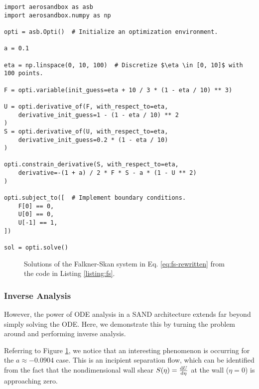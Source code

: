 \begin{listing}[H]
    \begin{verbatim}
import aerosandbox as asb
import aerosandbox.numpy as np

opti = asb.Opti()  # Initialize an optimization environment.

a = 0.1

eta = np.linspace(0, 10, 100)  # Discretize $\eta \in [0, 10]$ with 100 points.

F = opti.variable(init_guess=eta + 10 / 3 * (1 - eta / 10) ** 3)

U = opti.derivative_of(F, with_respect_to=eta,
    derivative_init_guess=1 - (1 - eta / 10) ** 2
)
S = opti.derivative_of(U, with_respect_to=eta,
    derivative_init_guess=0.2 * (1 - eta / 10)
)

opti.constrain_derivative(S, with_respect_to=eta,
    derivative=-(1 + a) / 2 * F * S - a * (1 - U ** 2)
)

opti.subject_to([  # Implement boundary conditions.
    F[0] == 0,
    U[0] == 0,
    U[-1] == 1,
])

sol = opti.solve()
    \end{verbatim}
    \caption{The AeroSandbox code to solve the Falkner-Skan system as in Eq. \ref{eq:fs-rewritten}.}
    \label{listing:fs}
\end{listing}

\begin{figure}[H]
    \centering
    \ifdraft{}{}
    \caption{Solutions of the Falkner-Skan system in Eq. \ref{eq:fs-rewritten} from the code in Listing \ref{listing:fs}.}
    \label{fig:fs}
\end{figure}

\subsubsection{Inverse Analysis}

However, the power of ODE analysis in a SAND architecture extends far beyond simply solving the ODE. Here, we demonstrate this by turning the problem around and performing inverse analysis.

Referring to Figure \ref{fig:fs}, we notice that an interesting phenomenon is occurring for the $a \approx -0.0904$ case. This is an incipient separation flow, which can be identified from the fact that the nondimensional wall shear $S(\eta) = \frac{\mathrm{d} U}{\mathrm{d} \eta}$ at the wall ($\eta = 0$) is approaching zero.

